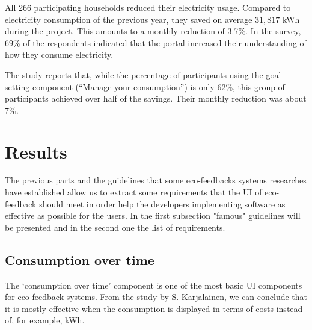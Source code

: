 \documentclass[journal]{vgtc}                %
\begin{document}
All 266 participating households reduced their electricity usage. Compared to electricity consumption of the previous year, they saved on average $31,817$ kWh during the project. This amounts to a monthly reduction of 3.7\%. In the survey, 69\% of the respondents indicated that the portal increased their understanding of how they consume electricity.

The study reports that, while the percentage of participants using the goal setting component (``Manage your consumption'') is only 62\%, this group of participants achieved over half of the savings. Their monthly reduction was about 7\%.

\section{Results}
The previous parts and the guidelines that some eco-feedbacks systems researches have established allow us to extract some requirements that the UI of eco-feedback should meet in order help the developers implementing software as effective as possible for the users. In the first subsection "famous" guidelines will be presented and in the second one the list of requirements. \\

%

\subsection{Consumption over time}
The `consumption over time' component is one of the most basic UI components for eco-feedback systems. From the study by S. Karjalainen, we can conclude that it is mostly effective when the consumption is displayed in terms of costs instead of, for example, kWh.
\end{document}
